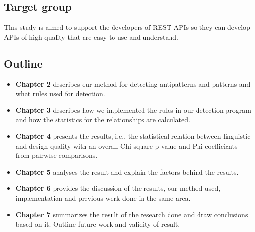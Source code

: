 \subsection{Target group}
This study is aimed to support the developers of REST APIs so they can develop APIs of high quality that are easy to use and understand. 

\subsection{Outline}

\begin{itemize}
\item \textbf{Chapter 2} describes our method for detecting antipatterns and patterns and what rules used for detection.
\item \textbf{Chapter 3} describes how we implemented the rules in our detection program and how the statistics for the relationships are calculated.
\item \textbf{Chapter 4} presents the results, i.e., the statistical relation between linguistic and design quality with an overall Chi-square p-value and Phi coefficients from pairwise comparisons.
\item \textbf{Chapter 5} analyses the result and explain the factors behind the results.
\item \textbf{Chapter 6} provides the discussion of the results, our method used, implementation and previous work done in the same area.
\item \textbf{Chapter 7} summarizes the result of the research done and draw conclusions based on it. Outline future work and validity of result.
\end{itemize}

\clearpage
\newpage